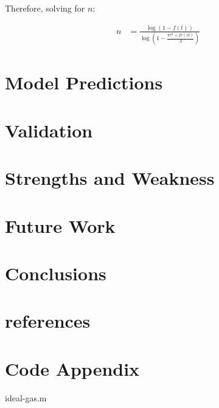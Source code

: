 \documentclass{article}
\begin{document}
Therefore, solving for $n$:

\begin{align}
n & = \frac{\log\left(1 - f(t)\right)}{\log\left( 1 - \frac{\pi r^2 + 2 r (v t)}{A}\right)}
\end{align}

\section{Model Predictions}
\section{Validation}
\section{Strengths and Weakness}
\section{Future Work}
\section{Conclusions}
\section{references}
\section{Code Appendix}

{ideal-gas.m}
\end{document}
